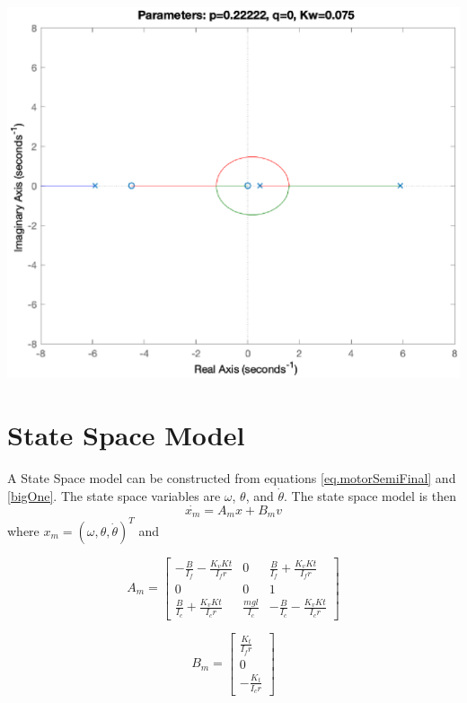 \documentclass[12pt,letterpaper]{article}
\begin{document}
\includegraphics[width=\textwidth]{images/rootLocusFull.eps} 
    \label{rootLocusFull}

\section{State Space Model}

A State Space model can be constructed from equations \eqref{eq.motorSemiFinal} and \eqref{bigOne}.  The
state space variables are $\omega$, $\theta$, and $\dot{\theta}$.  The state space model
is then
\begin{equation}
\dot{x_{m}} = A_{m} x + B_{m} v
\end{equation}
where $x_{m} = (\omega, \theta, \dot{\theta})^{T}$ and

\begin{equation}
A_{m} = 
\begin{bmatrix}
-\frac{B}{I_{f}}-\frac{K_{v} K{t}}{I_{f} r} & 0 & \frac{B}{I_{f}}+\frac{K_{v} K{t}}{I_{f} r}\\
0 & 0 & 1\\
\frac{B}{I_{c}}+\frac{K_{v} K{t}}{I_{c} r} & \frac{mgl}{I_{c}} & -\frac{B}{I_{c}}-\frac{K_{v} K{t}}{I_{c} r}
\end{bmatrix}
\end{equation}

\begin{equation}
B_{m} = 
\begin{bmatrix}
\frac{K_{t}}{I_{f} r} \\
0 \\
 -\frac{K_{t}}{I_{c} r}
\end{bmatrix}
\end{equation}
\end{document}
